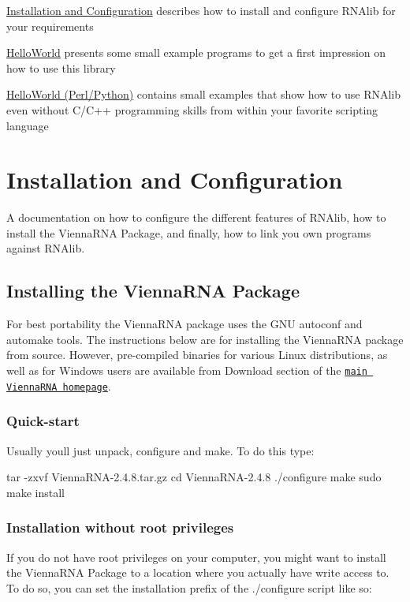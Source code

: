 
\begin{DoxyItemize}
\item \hyperlink{install}{Installation and Configuration} describes how to install and configure {\ttfamily R\+N\+Alib} for your requirements
\item \hyperlink{helloworld}{Hello\+World} presents some small example programs to get a first impression on how to use this library
\item \hyperlink{helloworld_swig}{Hello\+World (Perl/\+Python)} contains small examples that show how to use R\+N\+Alib even without C/\+C++ programming skills from within your favorite scripting language 
\end{DoxyItemize}\hypertarget{install}{}\section{Installation and Configuration}\label{install}
A documentation on how to configure the different features of {\ttfamily R\+N\+Alib}, how to install the Vienna\+R\+NA Package, and finally, how to link you own programs against {\ttfamily R\+N\+Alib}.\hypertarget{install_installation}{}\subsection{Installing the Vienna\+R\+N\+A Package}\label{install_installation}
For best portability the Vienna\+R\+NA package uses the G\+NU autoconf and automake tools. The instructions below are for installing the Vienna\+R\+NA package from source. However, pre-\/compiled binaries for various Linux distributions, as well as for Windows users are available from Download section of the \href{https://www.tbi.univie.ac.at/RNA}{\tt main Vienna\+R\+NA homepage}.\hypertarget{install_quickstart}{}\subsubsection{Quick-\/start}\label{install_quickstart}
Usually you\textquotesingle{}ll just unpack, configure and make. To do this type\+:

\begin{DoxyVerb}tar -zxvf ViennaRNA-2.4.8.tar.gz
cd ViennaRNA-2.4.8
./configure
make
sudo make install
\end{DoxyVerb}
\hypertarget{install_userdir_install}{}\subsubsection{Installation without root privileges}\label{install_userdir_install}
If you do not have root privileges on your computer, you might want to install the Vienna\+R\+NA Package to a location where you actually have write access to. To do so, you can set the installation prefix of the ./configure script like so\+:

